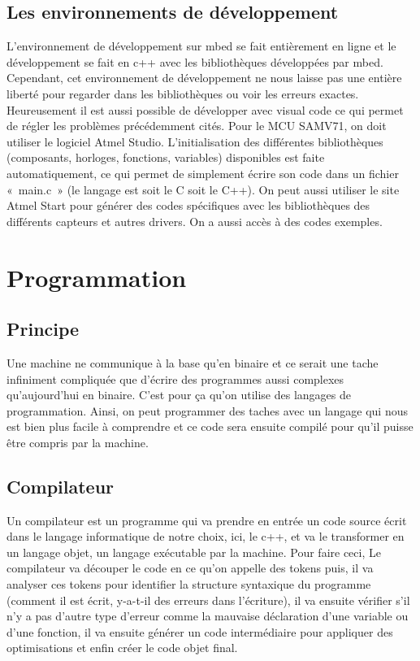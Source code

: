 \documentclass[12pt, a4paper, openright]{report}
\begin{document}
\subsection{Les environnements de développement}
L’environnement de développement sur mbed se fait entièrement en ligne et le développement se fait en c++ avec les bibliothèques développées par mbed. Cependant, cet environnement de développement ne nous laisse pas une entière liberté pour regarder dans les bibliothèques ou voir les erreurs exactes. Heureusement il est aussi possible de développer avec visual code ce qui permet de régler les problèmes précédemment cités.
Pour le MCU SAMV71, on doit utiliser le logiciel Atmel Studio. L’initialisation des différentes bibliothèques (composants, horloges, fonctions, variables) disponibles est faite automatiquement, ce qui permet de simplement écrire son code dans un fichier « main.c » (le langage est soit le C soit le C++). On peut aussi utiliser le site Atmel Start pour générer des codes spécifiques avec les bibliothèques des différents capteurs et autres drivers. On a aussi accès à des codes exemples. 

\section{Programmation}
\subsection{Principe}
Une machine ne communique à la base qu’en binaire et ce serait une tache infiniment compliquée que d’écrire des programmes aussi complexes qu’aujourd’hui en binaire. C’est pour ça qu’on utilise des langages de programmation. Ainsi, on peut programmer des taches avec un langage qui nous est bien plus facile à comprendre et ce code sera ensuite compilé pour qu’il puisse être compris par la machine.
\subsection{Compilateur}
Un compilateur est un programme qui va prendre en entrée un code source écrit dans le langage informatique de notre choix, ici, le c++, et va le transformer en un langage objet, un langage exécutable par la machine. Pour faire ceci, Le compilateur va découper le code en ce qu’on appelle des tokens puis, il va analyser ces tokens pour identifier la structure syntaxique du programme (comment il est écrit, y-a-t-il des erreurs dans l’écriture), il va ensuite vérifier s’il n’y a pas d’autre type d’erreur comme la mauvaise déclaration d’une variable ou d’une fonction, il va ensuite générer un code intermédiaire pour appliquer des optimisations et enfin créer le code objet final.
\end{document}
